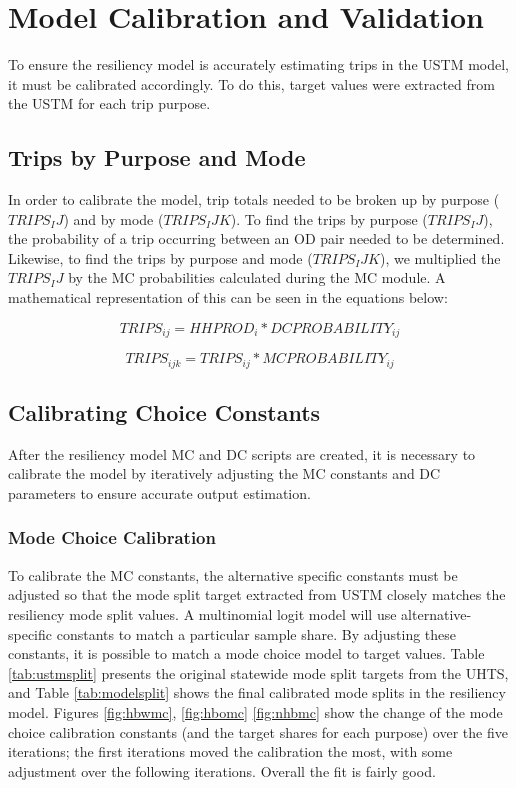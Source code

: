 \section{Model Calibration and Validation}

To ensure the resiliency model is accurately estimating trips in the USTM
model, it must be
calibrated accordingly. To do this, target values were extracted from the USTM
for each trip
purpose.

\subsection{Trips by Purpose and Mode}

In order to calibrate the model, trip totals needed to be broken up by purpose
($TRIPS_IJ$) and by mode ($TRIPS_IJK$). To find the trips by purpose
($TRIPS_IJ$), the probability of a trip occurring between an OD pair needed to
be determined. Likewise, to find the trips by purpose and mode ($TRIPS_IJK$),
we multiplied the $TRIPS_IJ$ by the MC probabilities calculated during the MC
module. A mathematical representation of this can be seen in the equations
below:

\begin{equation}
	TRIPS_{ij} = HHPROD_i * DCPROBABILITY_{ij}
	\label{eqn:ij}
\end{equation}

\begin{equation}
	TRIPS_{ijk} = TRIPS_{ij} * MCPROBABILITY_{ij}
	\label{eqn:ijk}
\end{equation}

\subsection{Calibrating Choice Constants}

After the resiliency model MC and DC scripts are created, it is necessary to
calibrate the model by iteratively adjusting the MC constants and DC
parameters to ensure accurate output estimation.

\subsubsection{Mode Choice Calibration}

To calibrate the MC constants, the alternative specific constants must be
adjusted so that the mode split target extracted from USTM closely matches the
resiliency mode split values. A multinomial logit model will use alternative-
specific constants to match a particular sample share. By adjusting these
constants, it is possible to match a mode choice model to target values.
Table \ref{tab:ustmsplit} presents the original statewide mode split targets from the UHTS,
and Table \ref{tab:modelsplit} shows the final calibrated mode splits in the resiliency model.
Figures \ref{fig:hbwmc}, \ref{fig:hbomc} \ref{fig:nhbmc} show the change of the mode choice calibration constants (and the target shares for each purpose) over the five iterations;
 the first iterations moved the calibration the most, with some adjustment
 over the following iterations. Overall the fit is fairly good.


